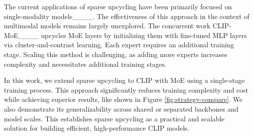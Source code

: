 The current applications of sparse upcycling have been primarily focused on single-modality models____. The effectiveness of this approach in the context of multimodal models remains largely unexplored. The concurrent work CLIP-MoE____ upcycles MoE layers by initializing them with fine-tuned MLP layers via cluster-and-contrast learning. Each expert requires an additional training stage. Scaling this method is challenging, as adding more experts increases complexity and necessitates additional training stages.

In this work, we extend sparse upcycling to CLIP with MoE using a single-stage training process. This approach significantly reduces training complexity and cost while achieving superior results, like shown in Figure \ref{fig:strategy-compare}. We also demonstrate its generalizability across shared or separated backbones 
and model scales. This establishes sparse upcycling as a practical and scalable solution for building efficient, high-performance CLIP models.

